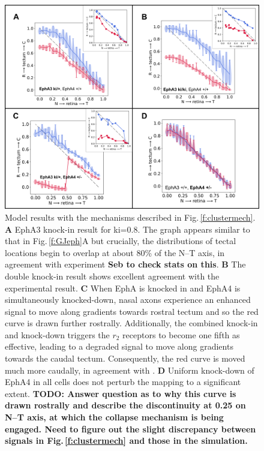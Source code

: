 \documentclass[11pt, a4paper]{article}
\begin{document}
\begin{figure}
\includegraphics[width=0.95\linewidth]{./images/EphA_manipulations_clustertheory_r2collapse.png}
\caption{Model results with the mechanisms described in Fig.\,\ref{f:clustermech}. \textbf{A} EphA3 knock-in result for ki=0.8. The graph appears similar to that in Fig.\,\ref{f:GJeph}A but crucially, the distributions of tectal locations begin to overlap at about 80\% of the N--T axis, in agreement with experiment \textbf{Seb to check stats on this}. \textbf{B} The double knock-in result shows excellent agreement with the experimental result. \textbf{C} When EphA is knocked in and EphA4 is simultaneously knocked-down, nasal axons experience an enhanced signal to move along gradients towards rostral tectum and so the red curve is drawn further rostrally. Additionally, the combined knock-in and knock-down triggers the $r_2$ receptors to become one fifth as effective, leading to a degraded signal to move along gradients towards the caudal tectum. Consequently, the red curve is moved much more caudally, in agreement with \citet{reber_relative_2004}. \textbf{D} Uniform knock-down of EphA4 in all cells does not perturb the mapping to a significant extent. \textbf{TODO: Answer question as to why this curve is drawn rostrally and describe the discontinuity at 0.25 on N--T axis, at which the collapse mechanism is being engaged. Need to figure out the slight discrepancy between signals in Fig.\,\ref{f:clustermech} and those in the simulation.}}
\label{f:r2collapse}
\end{figure}

\end{document}
